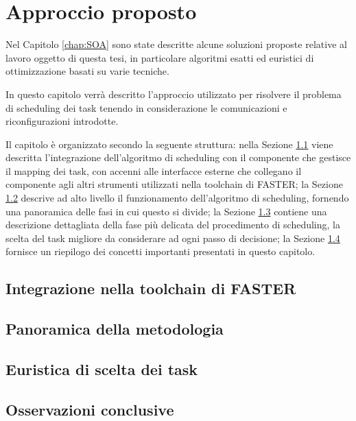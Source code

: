 \chapter{Approccio proposto}
\label{chap:approccio}
\vspace{1cm}
Nel Capitolo \ref{chap:SOA} sono state descritte alcune soluzioni proposte 
relative al lavoro oggetto di questa tesi, in particolare algoritmi esatti ed
euristici di ottimizzazione basati su varie tecniche.

In questo capitolo verrà descritto l'approccio utilizzato per risolvere il 
problema di scheduling dei task tenendo in considerazione le comunicazioni e 
riconfigurazioni introdotte.

Il capitolo è organizzato secondo la seguente struttura: nella Sezione 
\ref{sec:integrazioneToolchainFASTER} viene descritta l'integrazione 
dell'algoritmo di scheduling con il componente che gestisce il mapping dei task, 
con accenni alle interfacce esterne che collegano il componente 
agli altri strumenti utilizzati nella toolchain di \acs{FASTER}; la Sezione 
\ref{sec:panoramicaMetodologia} descrive  ad alto 
livello il funzionamento dell'algoritmo di scheduling, fornendo una 
panoramica delle fasi in cui questo si divide; la Sezione 
\ref{sec:euristicaSceltaTask} contiene una descrizione dettagliata della fase 
più delicata del procedimento di scheduling, la scelta del task migliore da 
considerare ad ogni passo di decisione; la Sezione 
\ref{sec:osservazioniConclusive} fornisce un riepilogo dei concetti importanti 
presentati in questo capitolo.


\section{Integrazione nella toolchain di \ac{FASTER}}
\label{sec:integrazioneToolchainFASTER}


\section{Panoramica della metodologia}
\label{sec:panoramicaMetodologia}


\section{Euristica di scelta dei task}
\label{sec:euristicaSceltaTask}


\section{Osservazioni conclusive}
\label{sec:osservazioniConclusive}
